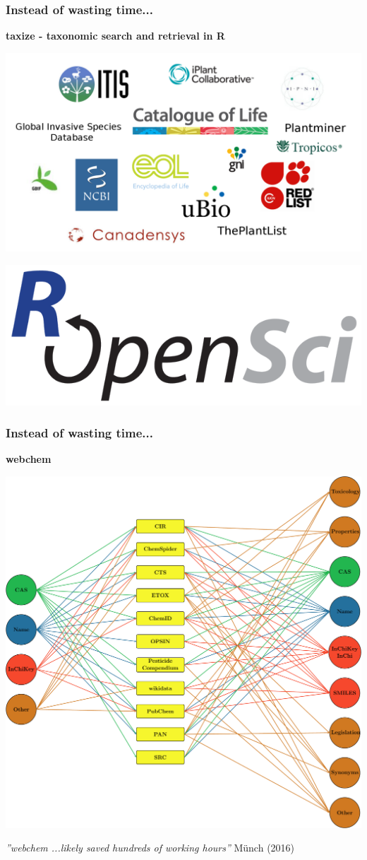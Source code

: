 \documentclass[12pt
, t
]{beamer}
\begin{document}
\begin{frame}
\frametitle{Instead of wasting time...}
\pause
\textbf{\textcolor{hilight}{taxize - taxonomic search and retrieval in R}}
\begin{center}
\includegraphics[width =.8\textwidth]{fig/sources.png}
\end{center}
\vfill
\includegraphics{fig/ropensci2.png}
\end{frame}



\begin{frame}
\frametitle{Instead of wasting time...}
\pause
\textbf{\textcolor{hilight}{webchem}}
\begin{center}
\vspace*{-1.5cm}\includegraphics[width =.7\textwidth]{fig/fig1.pdf} \\
\end{center}
\pause
\emph{''webchem ...likely saved hundreds of working hours''}
\vfill
\hfill 
\tiny Münch (2016)
\end{frame}
\end{document}
